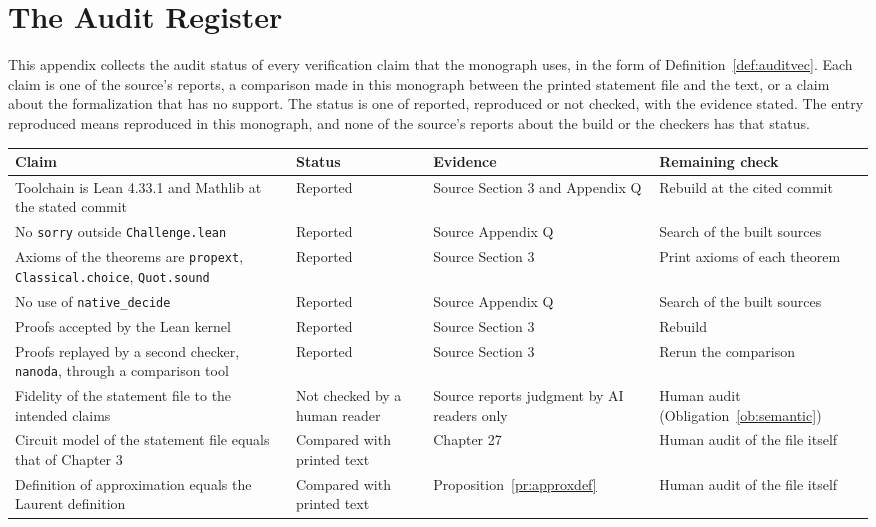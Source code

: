 \documentclass[11pt,letterpaper]{report}
\theoremstyle{plain}
\theoremstyle{definition}
\theoremstyle{remark}
\begin{document}
\section{The Audit Register}

This appendix collects the audit status of every verification claim that the monograph uses, in the form of Definition~\ref{def:auditvec}. Each claim is one of the source's reports, a comparison made in this monograph between the printed statement file and the text, or a claim about the formalization that has no support. The status is one of reported, reproduced or not checked, with the evidence stated. The entry reproduced means reproduced in this monograph, and none of the source's reports about the build or the checkers has that status.

\begin{longtable}{>{\raggedright\arraybackslash}p{}>{\raggedright\arraybackslash}p{}>{\raggedright\arraybackslash}p{}>{\raggedright\arraybackslash}p{}}
\hline
Claim & Status & Evidence & Remaining check\\
\hline
\endhead
Toolchain is Lean 4.33.1 and Mathlib at the stated commit & Reported & Source Section 3 and Appendix Q & Rebuild at the cited commit\\
No \texttt{sorry} outside \texttt{Challenge.lean} & Reported & Source Appendix Q & Search of the built sources\\
Axioms of the theorems are \texttt{propext}, \texttt{Classical.\allowbreak choice}, \texttt{Quot.\allowbreak sound} & Reported & Source Section 3 & Print axioms of each theorem\\
No use of \texttt{native\_decide} & Reported & Source Appendix Q & Search of the built sources\\
Proofs accepted by the Lean kernel & Reported & Source Section 3 & Rebuild\\
Proofs replayed by a second checker, \texttt{nanoda}, through a comparison tool & Reported & Source Section 3 & Rerun the comparison\\
Fidelity of the statement file to the intended claims & Not checked by a human reader & Source reports judgment by AI readers only & Human audit (Obligation~\ref{ob:semantic})\\
Circuit model of the statement file equals that of Chapter 3 & Compared with printed text & Chapter 27 & Human audit of the file itself\\
Definition of approximation equals the Laurent definition & Compared with printed text & Proposition~\ref{pr:approxdef} & Human audit of the file itself\\

\end{longtable}
\end{document}
